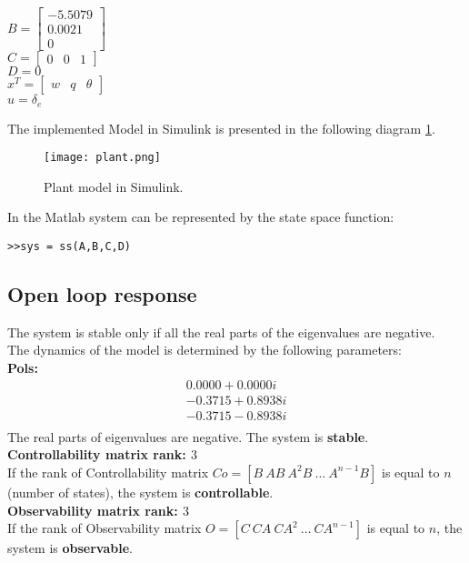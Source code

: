 \documentclass[../report.tex]{subfiles}
\begin{document}
$B = \begin{bmatrix} -5.5079   \\
                      0.0021   \\
                      0        \end{bmatrix}$ \\


$C = \begin{bmatrix}  0 & 0 & 1 \end{bmatrix}$ \\


$D = 0$ \\

$x^T = \begin{bmatrix} w & q & \theta \end{bmatrix}$ \\

$u = \delta_e$


The implemented Model in Simulink is presented in the following 
diagram \ref{fig:plant}.

\begin{figure}[h]
    \centering
    \texttt{[image: plant.png]}
    \caption{Plant model in Simulink.}
    \label{fig:plant}
\end{figure}

In the Matlab system can be represented by the state space function:
\begin{lstlisting}[frame=single]
>>sys = ss(A,B,C,D)
\end{lstlisting}



\subsection{Open loop response}
The system is stable only if all the real parts of the eigenvalues are
negative. \\
The dynamics of the model is determined by the following parameters:\\
\textbf{Pols:}
\begin{align*}
   0.0000 + 0.0000i \\
  -0.3715 + 0.8938i \\
  -0.3715 - 0.8938i \\
\end{align*}
The real parts of eigenvalues are negative. The system is \textbf{stable}.\\
\textbf{Controllability matrix rank: $3$} \\
If the rank of Controllability matrix $Co = [ B\ AB\ A^2B\ \dots\ A^{n-1}B ]$
is equal to $n$ (number of states), the system is \textbf{controllable}. \\
\textbf{Observability matrix rank: $3$} \\
If the rank of Observability matrix $O = [ C\ CA\ CA^2\ \dots\ CA^{n-1} ]$
is equal to $n$, the system is \textbf{observable}.
\end{document}
